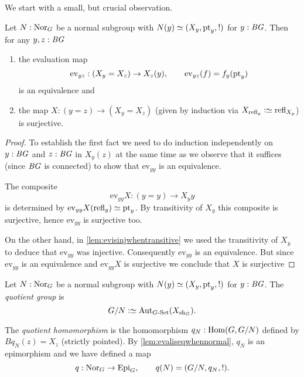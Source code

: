 We start with a small, but crucial observation.
\begin{lemma}
  \label{lem:evaliseqwhennormal}
  Let $N:\mathrm{Nor}_G$ be a normal subgroup with $N(y)\oldequiv (X_y,\pt_y,!)$ for $y:\mathit{B}\mathit{G}$.
  Then for any $y,z:\mathit{B}\mathit{G}$
  \begin{enumerate}
  \item the evaluation map
$$\mathrm{ev}_{yz}:(X_y=X_z)\to X_z(y),\qquad \mathrm{ev}_{yz}(f)=f_y(\mathrm{pt}_y)$$
is an equivalence and
  \item  the map $X:(y=z)\to(X_y=X_z)$ (given by induction via $X_{\refl y}\defequi\refl{X_y}$) is surjective.
  \end{enumerate}
\end{lemma}
\begin{proof}
To establish the first fact we need to do induction independently on $y:\mathit{B}\mathit{G}$ and $z:\mathit{B}\mathit{G}$ in $X_y(z)$ at the same time as we observe that it suffices (since $\mathit{B}\mathit{G}$ is connected) to show that $\mathrm{ev}_{yy}$ is an equivalence.

The composite
$$\mathrm{ev}_{yy}X:(y=y)\to X_yy$$ is determined by $\mathrm{ev}_{yy}X(\refl y)\oldequiv \pt_y$.
By transitivity of $X_y$ this composite is surjective, hence $\mathrm{ev}_{yy}$ is surjective too.

On the other hand, in  \cref{lem:evisinjwhentransitive} we used the transitivity of $X_y$ to deduce that $\mathrm{ev}_{yy}$ was injective.  Consequently $\mathrm{ev}_{yy}$ is an equivalence.  But since $\mathrm{ev}_{yy}$ is an equivalence and $\mathrm{ev}_{yy}X$ is surjective we conclude that $X$ is surjective
\end{proof}
\begin{definition}
\label{def:normalquotient}
Let $N:\mathrm{Nor}_G$ be a normal subgroup with $N(y)\oldequiv (X_y,\pt_y,!)$ for $y:\mathit{B}\mathit{G}$.  The \emph{quotient group} is
$$G/N\defequi\aut_{G\text{-}\Set}(X_{\sh_G}).
$$

The \emph{quotient homomorphism} is the homomorphism $q_N:\Hom(G,G/N)$  defined by $Bq_N(z)=X_z$ (strictly pointed).
By \cref{lem:evaliseqwhennormal}, $q_N$ is an epimorphism and we have defined a map
$$q:\mathrm{Nor}_G\to\mathrm{Epi}_G,\qquad q(N)=(G/N,q_N,!).$$
\end{definition}

